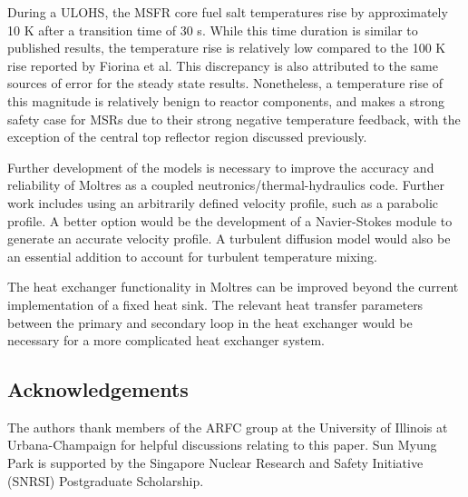 \documentclass{anstrans}
\begin{document}
	During a \gls{ULOHS}, the \gls{MSFR} core fuel salt temperatures rise by
	approximately 10 K after a transition time of 30 s. While this time
	duration is
	similar to published results, the temperature rise is relatively low
	compared to the 100 K rise reported by Fiorina et al.
	\cite{fiorina_modelling_2014} This discrepancy is also attributed to the
	same sources of error for the steady state results. Nonetheless, a
	temperature rise of
	this magnitude is relatively benign to reactor components, and makes
	a strong safety case for \glspl{MSR} due to their strong negative
	temperature feedback, with the exception of the central top reflector
	region discussed previously.
	
	Further development of the models is necessary to improve the accuracy
	and reliability of Moltres as a coupled neutronics/thermal-hydraulics code.
	Further work includes using an arbitrarily defined velocity profile, such
	as a parabolic profile. A better option would be the development of a
	Navier-Stokes module to generate an accurate velocity profile. A turbulent
	diffusion model would also be an essential addition to account for
	turbulent temperature mixing.
	
	The heat exchanger functionality in Moltres can be improved beyond
	the current implementation of a fixed heat sink. The relevant heat
	transfer parameters between the primary and secondary loop in the heat
	exchanger would be necessary for a more complicated heat exchanger system.

\begin{center}
\section*{Acknowledgements}
\end{center}
The authors thank members of the \gls{ARFC} group at the University of Illinois
at Urbana-Champaign for helpful discussions relating to this paper. Sun Myung
Park is supported by the Singapore Nuclear Research and Safety Initiative
(SNRSI) Postgraduate Scholarship.

\begin{center}
	
	
\end{center}
\end{document}
